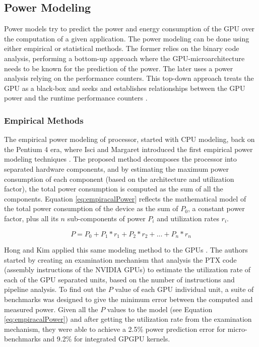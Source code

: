 \subsection{Power Modeling}
\label{subsection:powermodels}

Power models try to predict the power and energy consumption of the GPU over the computation of a given application. The power modeling can be done using either empirical or statistical methods. The former relies on the binary code analysis, performing a bottom-up approach where the GPU-microarchitecture needs to be known for the prediction of the power. The later uses a power analysis relying on the performance counters. This top-down approach treats the GPU as a black-box and seeks and establishes relationships between the GPU power and the runtime performance counters \cite{mei_survey_2016}.

\subsubsection{Empirical Methods}
\label{subsubsection:EmpiricalMethods}
The empirical power modeling of processor, started with CPU modeling, back on the Pentium 4 era, where Isci and Margaret introduced the first empirical power modeling techniques \cite{isci_runtime_2003}. The proposed method decomposes the processor into separated hardware components, and by estimating the maximum power consumption of each component (based on the architecture and utilization factor), the total power consumption is computed as the sum of all the components. Equation \ref{eq:empiracalPower} reflects the mathematical model of the total power consumption of the device as the sum of $P_0$, a constant power factor, plus all its $n$ sub-components of power $P_i$ and utilization rates $r_i$. 

\begin{equation}
\label{eq:empiracalPower}
    P = P_0 + P_1 * r_1 +  P_2 * r_2 + ... + P_n * r_n
\end{equation}

Hong and Kim applied this same modeling method to the GPUs \cite{hong_integrated_2010}. The authors started by creating an examination mechanism that analysis the PTX code (assembly instructions of the NVIDIA GPUs) to estimate the utilization rate of each of the GPU separated units, based on the number of instructions and pipeline analysis. To find out the $P$ value of each GPU individual unit, a suite of benchmarks was designed to give the minimum error between the computed and measured power. Given all the $P$ values to the model (see Equation \ref{eq:empiracalPower}) and after getting the utilization rate from the examination mechanism, they were able to achieve a 2.5\% power prediction error for micro-benchmarks and 9.2\% for integrated GPGPU kernels.


